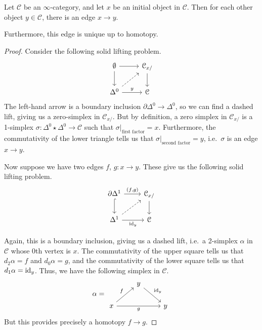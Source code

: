 \documentclass[main.tex]{subfiles}
\begin{document}
\begin{proposition}
  Let $\mathcal{C}$ be an $\infty$-category, and let $x$ be an initial object in $\mathcal{C}$. Then for each other object $y \in \mathcal{C}$, there is an edge $x \to y$.

  Furthermore, this edge is unique up to homotopy.
\end{proposition}
\begin{proof}
  Consider the following solid lifting problem.
  \begin{equation*}
    \begin{tikzcd}
      \emptyset
      \arrow[r]
      \arrow[d]
      & \mathcal{C}_{x/}
      \arrow[d]
      \\
      \Delta^{0}
      \arrow[ur, dashed]
      \arrow[r, "y"]
      & \mathcal{C}
    \end{tikzcd}
  \end{equation*}
  The left-hand arrow is a boundary inclusion $\partial \Delta^{0} \to \Delta^{0}$, so we can find a dashed lift, giving us a zero-simplex in $\mathcal{C}_{x/}$. But by definition, a zero simplex in $\mathcal{C}_{x/}$ is a 1-simplex $\sigma\colon \Delta^{0} \star \Delta^{0} \to \mathcal{C}$ such that $\sigma|_{\text{first factor}} = x$. Furthermore, the commutativity of the lower triangle tells us that $\sigma|_{\text{second factor}} = y$, i.e.\ $\sigma$ is an edge $x \to y$.

  Now suppose we have two edges $f$, $g\colon x \to y$. These give us the following solid lifting problem.
  \begin{equation*}
    \begin{tikzcd}
      \partial \Delta^{1}
      \arrow[r, "{(f, g)}"]
      \arrow[d, hookrightarrow]
      & \mathcal{C}_{x/}
      \arrow[d]
      \\
      \Delta^{1}
      \arrow[r, swap, "\id_{y}"]
      \arrow[ur, dashed]
      & \mathcal{C}
    \end{tikzcd}
  \end{equation*}

  Again, this is a boundary inclusion, giving us a dashed lift, i.e.\ a 2-simplex $\alpha$ in $\mathcal{C}$ whose 0th vertex is $x$. The commutativity of the upper square tells us that $d_{2}\alpha = f$ and $d_{0}\alpha = g$, and the commutativity of the lower square tells us that $d_{1}\alpha = \mathrm{id}_{y}$. Thus, we have the following simplex in $\mathcal{C}$.
  \begin{equation*}
    \alpha =
    \begin{tikzcd}
      & y
      \arrow[dr, "\id_{y}"]
      \\
      x
      \arrow[ur, "f"]
      \arrow[rr, swap, "g"]
      && y
    \end{tikzcd}
  \end{equation*}
  But this provides precisely a homotopy $f \to g$.
\end{proof}
\end{document}
